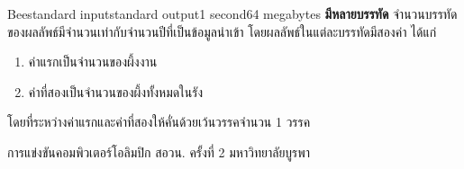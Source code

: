 \documentclass[11pt,a4paper]{article}
\begin{document}
\begin{problem}{Bee}{standard input}{standard output}{1 second}{64 megabytes}
\textbf{มีหลายบรรทัด} จำนวนบรรทัดของผลลัพธ์มีจำนวนเท่ากับจำนวนปีที่เป็นข้อมูลนำเข้า โดยผลลัพธ์ในแต่ละบรรทัดมีสองค่า ได้แก่
\begin{enumerate}

\item ค่าแรกเป็นจำนวนของผึ้งงาน
\item ค่าที่สองเป็นจำนวนของผึ้งทั้งหมดในรัง
\end{enumerate}

โดยที่ระหว่างค่าแรกและค่าที่สองให้คั่นด้วยเว้นวรรคจำนวน 1 วรรค

\Examples

\begin{example}
%
\end{example}

\Source

การแข่งขันคอมพิวเตอร์โอลิมปิก สอวน. ครั้งที่ 2 มหาวิทยาลัยบูรพา

\end{problem}
\end{document}
